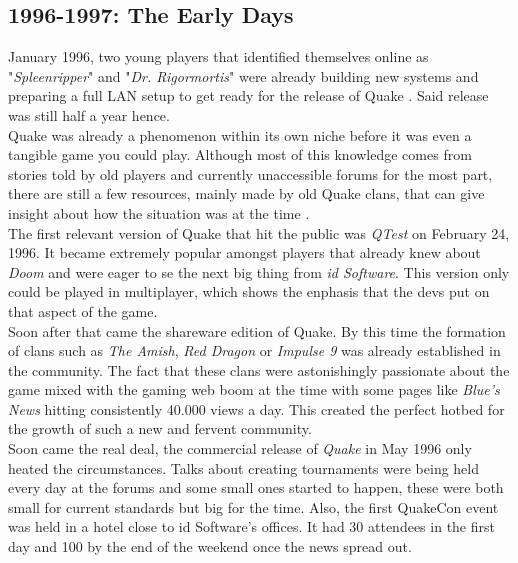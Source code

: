 \subsection{1996-1997: The Early Days}

January 1996, two young players that identified themselves online as "\textit{Spleenripper}" and "\textit{Dr. Rigormortis}" were already building new systems and preparing a full LAN setup to get ready for the release of Quake \citep{clanHistory}. Said release was still half a year hence.\\

Quake was already a phenomenon within its own niche before it was even a tangible game you could play.  Although most of this knowledge comes from stories told by old players and currently unaccessible forums for the most part, there are still a few resources, mainly made by old Quake clans, that can give insight about how the situation was at the time \citep{clanHistory}.\\

The first relevant version of Quake that hit the public was \textit{QTest} \citep{qtest} on February 24, 1996. It became extremely popular amongst players that already knew about \textit{Doom} \cite{game:doom} and were eager to se the next big thing from \textit{id Software}. This version only could be played in multiplayer, which shows the enphasis that the devs put on that aspect of the game.\\

Soon after that came the shareware edition of Quake. By this time the formation of clans such as \textit{The Amish}, \textit{Red Dragon} or \textit{Impulse 9} was already established in the community. The fact that these clans were astonishingly passionate about the game mixed with the gaming web boom at the time with some pages like \textit{Blue's News} hitting consistently 40.000 views a day. This created the perfect hotbed for the growth of such a new and fervent community.\\

Soon came the real deal, the commercial release of \textit{Quake} \citep{game:quake1} in May 1996 only heated the circumstances. Talks about creating tournaments were being held every day at the forums and some small ones started to happen, these were both small for current standards but big for the time. Also, the first QuakeCon \citep{quakecon} event was held in a hotel close to id Software's offices. It had 30 attendees in the first day and 100 by the end of the weekend once the news spread out.\\

